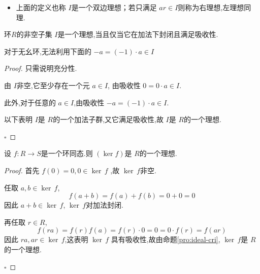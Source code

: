 \documentclass[lang=cn,12pt,color=green,fontset=none,pad]{elegantbook}
\begin{document}
\begin{remark}
    \begin{itemize}
        \item 上面的定义也称 $ I $是一个双边理想；若只满足 $ ar \in I $则称为右理想,左理想同理.  
    \end{itemize}
    
\end{remark}

\begin{proposition}\label{pro:ideal-cri}
     环$ R $的非空子集 $ I $是一个理想,当且仅当它在加法下封闭且满足吸收性.
\end{proposition}
\begin{remark}
    对于无幺环,无法利用下面的 \(  -a = \left( -1 \right)\cdot a \in I   \) 
\end{remark}
\begin{proof} 只需说明充分性.

    由 $ I $非空,它至少存在一个元 $ a \in I $,  由吸收性 $ 0 = 0\cdot a \in I$. 
    
    此外,对于任意的 $ a \in I $,由吸收性 $ -a = \left( -1 \right)\cdot a \in  I  $.

    以下表明 $ I $是 $ R $的一个加法子群,又它满足吸收性,故 $ I $是 $ R $的一个理想.    

    \hfill $\square$
\end{proof}

\begin{proposition}
    设 $ f:R\to S $是一个环同态.则 $ \left( \ker f \right)  $是 $ R $的一个理想. 
\end{proposition}
\begin{proof}
    首先 $ f\left( 0 \right) = 0,0 \in \operatorname{ker}\,f  $ ,故 $ \operatorname{ker}\,f $非空.
    
    任取 $ a, b \in \operatorname{ker}\,f $, $$
    f\left( a+ b \right) = f\left( a \right)+ f\left( b \right) = 0+ 0 = 0   
    $$因此 $ a+ b \in \operatorname{ker}\,f $, $ \operatorname{ker}\,f $对加法封闭.
    
    再任取 $ r \in R $, $$
    f\left( ra \right) = f\left( r \right)f\left( a \right) = f\left( r \right)\cdot 0 = 0 = 0 \cdot  f\left( r \right) = f\left( ar \right)      
    $$ 因此 $ ra,ar \in  \operatorname{ker}\,f $,这表明 $ \operatorname{ker}\,f $  具有吸收性,故由命题\ref{pro:ideal-cri}, $ \operatorname{ker}\,f $是 $ R $的一个理想.  

    \hfill $\square$
\end{proof}
\end{document}
